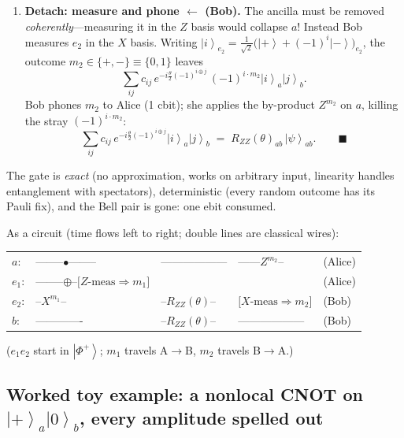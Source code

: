 \documentclass[11pt]{article}
\newcommand{\ket}[1]{\left|#1\right\rangle}
\newcommand{\Phip}{\ket{\Phi^{+}}}
\newcommand{\RZZ}{R_{ZZ}}
\begin{document}
\begin{enumerate}[leftmargin=2em, itemsep=0.6em]
\item \textbf{Detach: measure and phone $\leftarrow$ (Bob).} The ancilla must
be removed \emph{coherently}---measuring it in the $Z$ basis would collapse
$a$! Instead Bob measures $e_2$ in the $X$ basis. Writing
$\ket{i}_{e_2} = \frac{1}{\sqrt 2}\big(\ket{+} + (-1)^i \ket{-}\big)_{e_2}$,
the outcome $m_2 \in \{+,-\} \equiv \{0,1\}$ leaves
\[
\sum_{ij} c_{ij}\, e^{-i\frac{\theta}{2}(-1)^{i\oplus j}}\,
(-1)^{i \cdot m_2} \ket{i}_a \ket{j}_b .
\]
Bob phones $m_2$ to Alice (1 cbit); she applies the by-product $Z^{m_2}$ on
$a$, killing the stray $(-1)^{i\cdot m_2}$:
\[
\sum_{ij} c_{ij}\, e^{-i\frac{\theta}{2}(-1)^{i\oplus j}}
\ket{i}_a \ket{j}_b
\;=\; \RZZ(\theta)_{ab}\,\ket{\psi}_{ab}. \qquad \blacksquare
\]
\end{enumerate}

The gate is \emph{exact} (no approximation, works on arbitrary input,
linearity handles entanglement with spectators), deterministic (every random
outcome has its Pauli fix), and the Bell pair is gone: one ebit consumed.

As a circuit (time flows left to right; double lines are classical wires):

\begin{center}
\begin{tabular}{lllll}
$a$:\;   & --------$\bullet$-------- & ------------------ & ------$Z^{m_2}$-- & (Alice) \\
$e_1$:\; & --------$\oplus$--$\big[Z\text{-meas} \Rightarrow m_1\big]$ & & & (Alice) \\
$e_2$:\; & --$X^{m_1}$-- & --$\RZZ(\theta)$-- & $\big[X\text{-meas} \Rightarrow m_2\big]$ & (Bob) \\
$b$:\;   & ------------- & --$\RZZ(\theta)$-- & ------------------ & (Bob) \\
\end{tabular}

\smallskip
{\small ($e_1 e_2$ start in $\Phip$; $m_1$ travels A$\to$B, $m_2$ travels B$\to$A.)}
\end{center}

\subsection{Worked toy example: a nonlocal CNOT on
$\ket{+}_a\ket{0}_b$, every amplitude spelled out}
\label{sec:toy}
\end{document}
